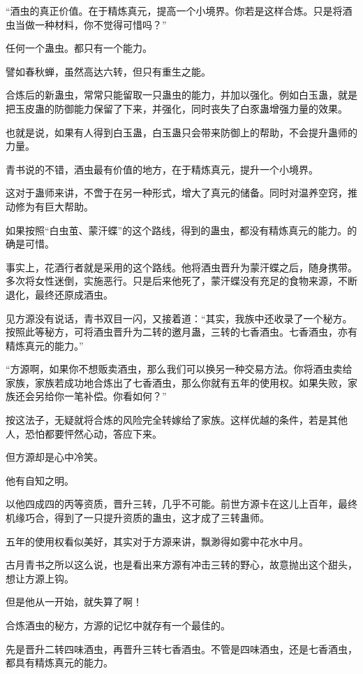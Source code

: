 \begin{this_body}
“酒虫的真正价值。在于精炼真元，提高一个小境界。你若是这样合炼。只是将酒虫当做一种材料，你不觉得可惜吗？”

任何一个蛊虫。都只有一个能力。

譬如春秋蝉，虽然高达六转，但只有重生之能。

合炼后的新蛊虫，常常只能留取一只蛊虫的能力，并加以强化。例如白玉蛊，就是把玉皮蛊的防御能力保留了下来，并强化，同时丧失了白豕蛊增强力量的效果。

也就是说，如果有人得到白玉蛊，白玉蛊只会带来防御上的帮助，不会提升蛊师的力量。

青书说的不错，酒虫最有价值的地方，在于精炼真元，提升一个小境界。

这对于蛊师来讲，不啻于在另一种形式，增大了真元的储备。同时对温养空窍，推动修为有巨大帮助。

如果按照“白虫茧、蒙汗蝶”的这个路线，得到的蛊虫，都没有精炼真元的能力。的确是可惜。

事实上，花酒行者就是采用的这个路线。他将酒虫晋升为蒙汗蝶之后，随身携带。多次将女性迷倒，实施恶行。只是后来他死了，蒙汗蝶没有充足的食物来源，不断退化，最终还原成酒虫。

见方源没有说话，青书双目一闪，又接着道：“其实，我族中还收录了一个秘方。按照此等秘方，可将酒虫晋升为二转的邀月蛊，三转的七香酒虫。七香酒虫，亦有精炼真元的能力。”

“方源啊，如果你不想贩卖酒虫，那么我们可以换另一种交易方法。你将酒虫卖给家族，家族若成功地合炼出了七香酒虫，那么你就有五年的使用权。如果失败，家族还会另给你一笔补偿。你看如何？”

按这法子，无疑就将合炼的风险完全转嫁给了家族。这样优越的条件，若是其他人，恐怕都要怦然心动，答应下来。

但方源却是心中冷笑。

他有自知之明。

以他四成四的丙等资质，晋升三转，几乎不可能。前世方源卡在这儿上百年，最终机缘巧合，得到了一只提升资质的蛊虫，这才成了三转蛊师。

五年的使用权看似美好，其实对于方源来讲，飘渺得如雾中花水中月。

古月青书之所以这么说，也是看出来方源有冲击三转的野心，故意抛出这个甜头，想让方源上钩。

但是他从一开始，就失算了啊！

合炼酒虫的秘方，方源的记忆中就存有一个最佳的。

先是晋升二转四味酒虫，再晋升三转七香酒虫。不管是四味酒虫，还是七香酒虫，都具有精炼真元的能力。


\end{this_body}
